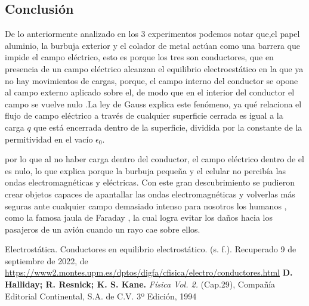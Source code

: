 \documentclass[]{article}
\begin{document}
\begin{multicols*}{2}


\section*{Conclusión}
De lo anteriormente analizado en los 3 experimentos podemos notar que,el papel aluminio, la burbuja exterior y el colador de metal actúan como una barrera que impide el campo eléctrico, esto es porque los tres son conductores, que en presencia de un campo eléctrico alcanzan el equilibrio electroestático en la que ya no hay movimientos de cargas, porque, el campo interno del conductor se opone al campo externo aplicado sobre el, de modo que en el interior del conductor el campo se vuelve nulo \cite{Electrostatica}.La ley de Gauss explica este fenómeno, ya qué relaciona el flujo de campo eléctrico a través de cualquier superficie cerrada es igual a la carga $q$ que está encerrada dentro de la superficie, dividida por la constante de la permitividad en el vacío $\epsilon_0$.

por lo que al no haber carga dentro del conductor, el campo eléctrico dentro de el es nulo, lo que explica porque la burbuja pequeña y el celular no percibía las ondas electromagnéticas y eléctricas.
Con este gran descubrimiento se pudieron crear objetos capaces de apantallar las ondas electromagnéticas y volverlas más seguras ante cualquier campo demasiado intenso para nosotros los humanos , como la famosa jaula de Faraday , la cual logra evitar los daños hacia los pasajeros de un avión cuando un rayo cae sobre ellos.


\end{multicols*}



\begin{thebibliography}{5}
      Electrostática. Conductores en equilibrio electrostático. (s. f.). Recuperado 9 de septiembre de 2022, 
    de \url{https://www2.montes.upm.es/dptos/digfa/cfisica/electro/conductores.html}
     \textbf{D. Halliday; R. Resnick; K. S. Kane.} \textit{Física Vol. 2.} (Cap.29), Compañía Editorial Continental, S.A. de C.V. 3º Edición, 1994
\end{thebibliography}
\end{document}
